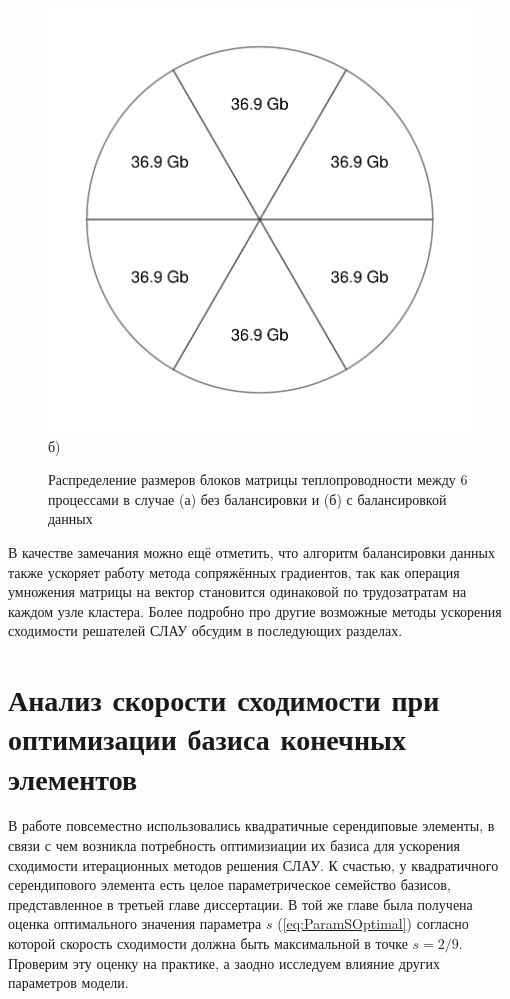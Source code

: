 \begin{figure}[ht]
\begin{minipage}[b][][b]{0.49\linewidth}
        \includegraphics[width=\linewidth]{pics/PieChartBalance.pdf} \\ б)
    \end{minipage}
    \caption{Распределение размеров блоков матрицы теплопроводности между 6 процессами в случае (а) без балансировки и (б) с балансировкой данных}
    \label{fig:MPIBalance}
\end{figure}

В качестве замечания можно ещё отметить, что алгоритм балансировки данных также ускоряет работу метода сопряжённых градиентов, так как операция умножения матрицы на вектор становится одинаковой по трудозатратам на каждом узле кластера. Более подробно про другие возможные методы ускорения сходимости решателей СЛАУ обсудим в последующих разделах.

\section{Анализ скорости сходимости при оптимизации базиса конечных элементов}\label{sec:NumericalMethods/BasisOptimization}

В работе повсеместно использовались квадратичные серендиповые элементы, в связи с чем возникла потребность оптимизиации их базиса для ускорения сходимости итерационных методов решения СЛАУ. К счастью, у квадратичного серендипового элемента есть целое параметрическое семейство базисов, представленное в третьей главе диссертации. В той же главе была получена оценка оптимального значения параметра $s$ (\ref{eq:ParamSOptimal}) согласно которой скорость сходимости должна быть максимальной в точке $s = 2/9$. Проверим эту оценку на практике, а заодно исследуем влияние других параметров модели.

